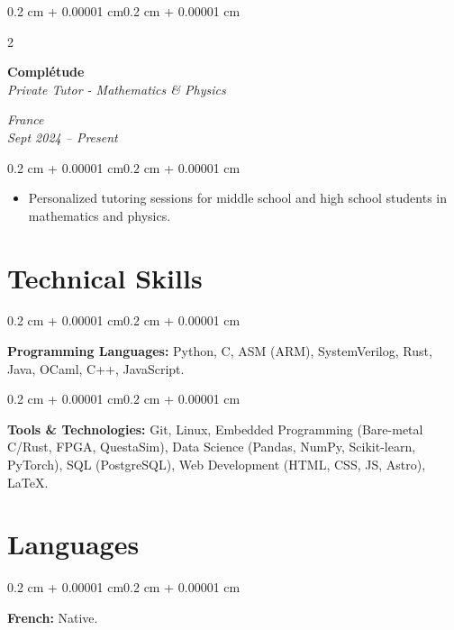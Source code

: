 \documentclass[10pt, a4paper]{article}
\newenvironment{highlights}{
    \begin{itemize}[
        topsep=0.10 cm,
        parsep=0.10 cm,
        partopsep=0pt,
        itemsep=0pt,
        leftmargin=0.4 cm + 10pt
    ]
}{
    \end{itemize}
}
\newenvironment{onecolentry}{
    \begin{adjustwidth}{0.2 cm + 0.00001 cm}{0.2 cm + 0.00001 cm}
}{
    \end{adjustwidth}
}
\newenvironment{twocolentry}[2][]{
    \onecolentry
    \def\secondColumn{#2}
    \setcolumnwidth{\fill, 4.5 cm}
    \begin{paracol}{2}
}{
    \switchcolumn \raggedleft \secondColumn
    \end{paracol}
    \endonecolentry
}
\begin{document}
        \begin{twocolentry}{
        \textit{France} \\
        \textit{Sept 2024 – Present}}
            \textbf{Complétude} \\
            \textit{Private Tutor - Mathematics \& Physics}
        \end{twocolentry}

        \vspace{0.10 cm}
        \begin{onecolentry}
            \begin{highlights}
                \item Personalized tutoring sessions for middle school and high
                    school students in mathematics and physics.
            \end{highlights}
        \end{onecolentry}

    \section{Technical Skills}

        \begin{onecolentry}
            \textbf{Programming Languages:} Python, C, ASM (ARM), SystemVerilog,
            Rust, Java, OCaml, C++, JavaScript.
        \end{onecolentry}

        \vspace{0.2 cm}

        \begin{onecolentry}
            \textbf{Tools \& Technologies:} Git, Linux, Embedded Programming
            (Bare-metal C/Rust, FPGA, QuestaSim), Data Science (Pandas, NumPy,
            Scikit-learn, PyTorch), SQL (PostgreSQL), Web Development (HTML,
            CSS, JS, Astro), \LaTeX.
        \end{onecolentry}

    \section{Languages}

        \begin{onecolentry}
            \textbf{French:} Native.
        \end{onecolentry}

        \vspace{0.2 cm}
\end{document}
